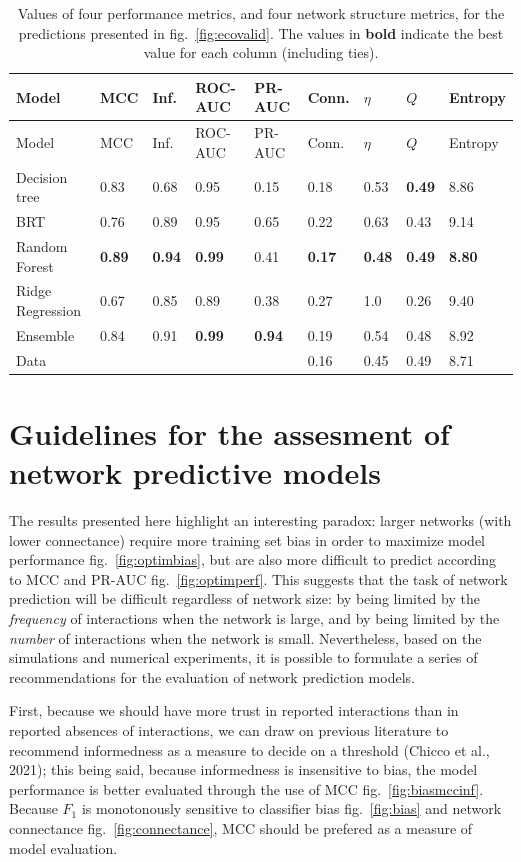 \documentclass[11pt]{article}
\begin{document}
\hypertarget{tbl:comparison}{}
\begin{longtable}[]{@{}lllllllll@{}}
\caption{\label{tbl:comparison}Values of four performance metrics, and
four network structure metrics, for the predictions presented in
fig.~\ref{fig:ecovalid}. The values in \textbf{bold} indicate the best
value for each column (including ties).}\tabularnewline
\toprule
Model & MCC & Inf. & ROC-AUC & PR-AUC & Conn. & \(\eta\) & \(Q\) &
Entropy\tabularnewline
\midrule
\endfirsthead
\toprule
Model & MCC & Inf. & ROC-AUC & PR-AUC & Conn. & \(\eta\) & \(Q\) &
Entropy\tabularnewline
\midrule
\endhead
Decision tree & 0.83 & 0.68 & 0.95 & 0.15 & 0.18 & 0.53 & \textbf{0.49}
& 8.86\tabularnewline
BRT & 0.76 & 0.89 & 0.95 & 0.65 & 0.22 & 0.63 & 0.43 &
9.14\tabularnewline
Random Forest & \textbf{0.89} & \textbf{0.94} & \textbf{0.99} & 0.41 &
\textbf{0.17} & \textbf{0.48} & \textbf{0.49} &
\textbf{8.80}\tabularnewline
Ridge Regression & 0.67 & 0.85 & 0.89 & 0.38 & 0.27 & 1.0 & 0.26 &
9.40\tabularnewline
Ensemble & 0.84 & 0.91 & \textbf{0.99} & \textbf{0.94} & 0.19 & 0.54 &
0.48 & 8.92\tabularnewline
Data & & & & & 0.16 & 0.45 & 0.49 & 8.71\tabularnewline
\bottomrule
\end{longtable}

\hypertarget{guidelines-for-the-assesment-of-network-predictive-models}{%
\section{Guidelines for the assesment of network predictive
models}\label{guidelines-for-the-assesment-of-network-predictive-models}}

The results presented here highlight an interesting paradox: larger
networks (with lower connectance) require more training set bias in
order to maximize model performance fig.~\ref{fig:optimbias}, but are
also more difficult to predict according to MCC and PR-AUC
fig.~\ref{fig:optimperf}. This suggests that the task of network
prediction will be difficult regardless of network size: by being
limited by the \emph{frequency} of interactions when the network is
large, and by being limited by the \emph{number} of interactions when
the network is small. Nevertheless, based on the simulations and
numerical experiments, it is possible to formulate a series of
recommendations for the evaluation of network prediction models.

First, because we should have more trust in reported interactions than
in reported absences of interactions, we can draw on previous literature
to recommend informedness as a measure to decide on a threshold (Chicco
et al., 2021); this being said, because informedness is insensitive to
bias, the model performance is better evaluated through the use of MCC
fig.~\ref{fig:biasmccinf}. Because \(F_1\) is monotonously sensitive to
classifier bias fig.~\ref{fig:bias} and network connectance
fig.~\ref{fig:connectance}, MCC should be prefered as a measure of model
evaluation.
\end{document}
